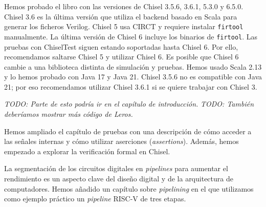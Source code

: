 \documentclass[%
    10pt,
    headinclude, footinclude=false,
    openright, %
    notitlepage,
    cleardoublepage=empty,
    headsepline,
    numbers=noenddot,
    bibliography=totoc, index=totoc,
    ]{scrbook}
\newcommand{\code}[1]{{\lstinline[basicstyle=\small\ttfamily]{#1}}}
\newcommand{\todo}[1]{{\emph{TODO: #1}}}
\begin{document}

Hemos probado el libro con las versiones de Chisel 3.5.6, 3.6.1, 5.3.0 y 6.5.0. Chisel 3.6 es la última versión que 
utiliza el backend basado en Scala para generar los ficheros Verilog. Chisel 5 usa CIRCT y requiere instalar 
\code{firtool} manualmente. La última versión de Chisel 6 incluye los binarios de \code{firtool}. Las pruebas con 
ChiselTest siguen estando soportadas hasta Chisel 6. Por ello, recomendamos saltarse Chisel 5 y utilizar Chisel 6. 
Es posible que Chisel 6 cambie a una biblioteca distinta de simulación y pruebas. Hemos usado Scala 2.13 y lo hemos 
probado con Java 17 y Java 21. Chisel 3.5.6 no es compatible con Java 21; por eso recomendamos utilizar Chisel 3.6.1 
si se quiere trabajar con Chisel 3.



\todo{Parte de esto podría ir en el capítulo de introducción.}
\todo{También deberíamos mostrar más código de Leros.}


Hemos ampliado el capítulo de pruebas con una descripción de cómo acceder a las señales internas y cómo utilizar 
aserciones (\textit{assertions}). Además, hemos empezado a explorar la verificación formal en Chisel.


La segmentación de los circuitos digitales en \emph{pipelines} para aumentar el rendimiento es un aspecto clave 
del diseño digital y de la arquitectura de computadores. Hemos añadido un capítulo sobre \emph{pipelining} en el 
que utilizamos como ejemplo práctico un \emph{pipeline} RISC-V de tres etapas.
\end{document}
